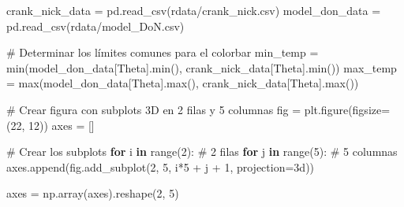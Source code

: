 \documentclass[
  spanish,
  us-letterpaper,
]{scrreprt}
\newenvironment{Shaded}{\begin{snugshade}}{\end{snugshade}}
\newcommand{\BuiltInTok}[1]{\textcolor[rgb]{0.00,0.23,0.31}{#1}}
\newcommand{\CommentTok}[1]{\textcolor[rgb]{0.37,0.37,0.37}{#1}}
\newcommand{\ControlFlowTok}[1]{\textcolor[rgb]{0.00,0.23,0.31}{\textbf{#1}}}
\newcommand{\DecValTok}[1]{\textcolor[rgb]{0.68,0.00,0.00}{#1}}
\newcommand{\KeywordTok}[1]{\textcolor[rgb]{0.00,0.23,0.31}{\textbf{#1}}}
\newcommand{\NormalTok}[1]{\textcolor[rgb]{0.00,0.23,0.31}{#1}}
\newcommand{\OperatorTok}[1]{\textcolor[rgb]{0.37,0.37,0.37}{#1}}
\newcommand{\StringTok}[1]{\textcolor[rgb]{0.13,0.47,0.30}{#1}}
\newcommand{\VerbatimStringTok}[1]{\textcolor[rgb]{0.13,0.47,0.30}{#1}}
\theoremstyle{definition}
\theoremstyle{plain}
\theoremstyle{remark}
\begin{document}
\begin{Shaded}
\begin{Highlighting}[]
\NormalTok{crank\_nick\_data }\OperatorTok{=}\NormalTok{ pd.read\_csv(}\VerbatimStringTok{r\textquotesingle{}data/crank\_nick}\DecValTok{.}\VerbatimStringTok{csv\textquotesingle{}}\NormalTok{)}
\NormalTok{model\_don\_data }\OperatorTok{=}\NormalTok{ pd.read\_csv(}\VerbatimStringTok{r\textquotesingle{}data/model\_DoN}\DecValTok{.}\VerbatimStringTok{csv\textquotesingle{}}\NormalTok{)}

\CommentTok{\# Determinar los límites comunes para el colorbar}
\NormalTok{min\_temp }\OperatorTok{=} \BuiltInTok{min}\NormalTok{(model\_don\_data[}\StringTok{\textquotesingle{}Theta\textquotesingle{}}\NormalTok{].}\BuiltInTok{min}\NormalTok{(),}
\NormalTok{                crank\_nick\_data[}\StringTok{\textquotesingle{}Theta\textquotesingle{}}\NormalTok{].}\BuiltInTok{min}\NormalTok{())}
\NormalTok{max\_temp }\OperatorTok{=} \BuiltInTok{max}\NormalTok{(model\_don\_data[}\StringTok{\textquotesingle{}Theta\textquotesingle{}}\NormalTok{].}\BuiltInTok{max}\NormalTok{(), }
\NormalTok{                crank\_nick\_data[}\StringTok{\textquotesingle{}Theta\textquotesingle{}}\NormalTok{].}\BuiltInTok{max}\NormalTok{())}

\CommentTok{\# Crear figura con subplots 3D en 2 filas y 5 columnas}
\NormalTok{fig }\OperatorTok{=}\NormalTok{ plt.figure(figsize}\OperatorTok{=}\NormalTok{(}\DecValTok{22}\NormalTok{, }\DecValTok{12}\NormalTok{))}
\NormalTok{axes }\OperatorTok{=}\NormalTok{ []}

\CommentTok{\# Crear los subplots}
\ControlFlowTok{for}\NormalTok{ i }\KeywordTok{in} \BuiltInTok{range}\NormalTok{(}\DecValTok{2}\NormalTok{):  }\CommentTok{\# 2 filas}
    \ControlFlowTok{for}\NormalTok{ j }\KeywordTok{in} \BuiltInTok{range}\NormalTok{(}\DecValTok{5}\NormalTok{):  }\CommentTok{\# 5 columnas}
\NormalTok{        axes.append(fig.add\_subplot(}\DecValTok{2}\NormalTok{, }\DecValTok{5}\NormalTok{, i}\OperatorTok{*}\DecValTok{5} \OperatorTok{+}\NormalTok{ j }\OperatorTok{+} \DecValTok{1}\NormalTok{, projection}\OperatorTok{=}\StringTok{\textquotesingle{}3d\textquotesingle{}}\NormalTok{))}

\NormalTok{axes }\OperatorTok{=}\NormalTok{ np.array(axes).reshape(}\DecValTok{2}\NormalTok{, }\DecValTok{5}\NormalTok{)}


\end{Highlighting}
\end{Shaded}
\end{document}
